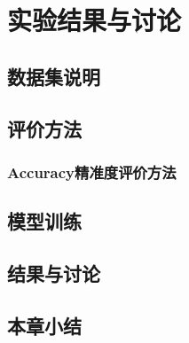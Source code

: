 
\chapter{实验结果与讨论}

\section{数据集说明}

\section{评价方法}

\subsection{Accuracy精准度评价方法}

\section{模型训练}

\section{结果与讨论}

\section{本章小结}
